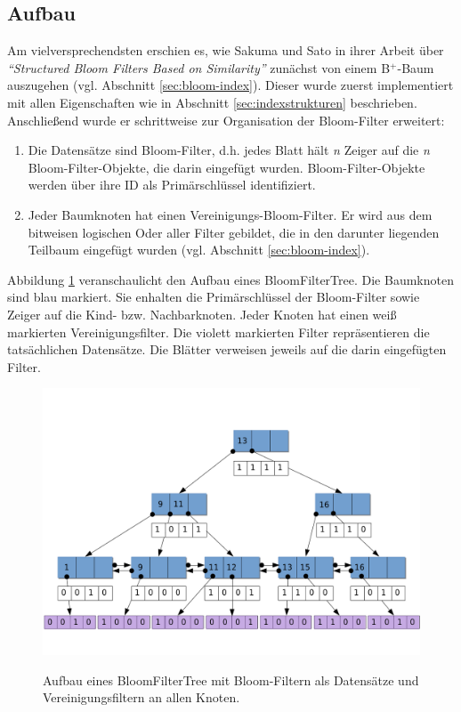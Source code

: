 \subsection{Aufbau}\label{sec:aufbau} 
Am vielversprechendsten erschien es, wie Sakuma und Sato in ihrer Arbeit über \textit{"`Structured Bloom Filters Based on Similarity"'} \cite{Sakuma2011} zunächst von einem B$^+$-Baum auszugehen (vgl. Abschnitt \ref{sec:bloom-index}). Dieser wurde zuerst implementiert mit allen Eigenschaften wie in Abschnitt \ref{sec:indexstrukturen} beschrieben. Anschließend wurde er schrittweise zur Organisation der Bloom-Filter erweitert: 
\begin{enumerate}
\setlength{\itemsep}{20pt}
	\item Die Datensätze sind Bloom-Filter, d.h. jedes Blatt hält \textit{n} Zeiger auf die \textit{n} Bloom-Filter-Objekte, die darin eingefügt wurden. Bloom-Filter-Objekte werden über ihre ID als Primärschlüssel identifiziert. 
	\item Jeder Baumknoten hat einen Vereinigungs-Bloom-Filter. Er wird aus dem bitweisen logischen Oder aller Filter gebildet, die in den darunter liegenden Teilbaum eingefügt wurden (vgl. Abschnitt \ref{sec:bloom-index}).
\end{enumerate}
Abbildung \ref{fig:bloomfiltertree} veranschaulicht den Aufbau eines BloomFilterTree. Die Baumknoten sind blau markiert. Sie enhalten die Primärschlüssel der Bloom-Filter sowie Zeiger auf die Kind- bzw. Nachbarknoten. Jeder Knoten hat einen weiß markierten Vereinigungsfilter. Die violett markierten Filter repräsentieren die tatsächlichen Datensätze. Die Blätter verweisen jeweils auf die darin eingefügten Filter.
\begin{figure}[hpbt]
  \centering
  \includegraphics[width=1.0\textwidth]{pictures/bloom-filter-tree2.png}\\
  \caption[Aufbau eines BloomFilterTree]{Aufbau eines BloomFilterTree mit Bloom-Filtern als Datensätze und Vereinigungsfiltern an allen Knoten.}\label{fig:bloomfiltertree}
\end{figure}
